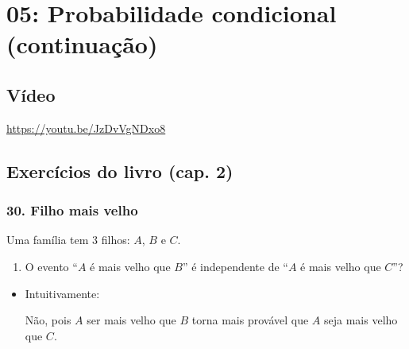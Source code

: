 \documentclass[
  11pt]{report}
\providecommand{\tightlist}{%
  \setlength{\itemsep}{0pt}\setlength{\parskip}{0pt}}
\begin{document}
\hypertarget{probabilidade-condicional-continuauxe7uxe3o}{%
\chapter*{05: Probabilidade condicional (continuação)}\label{probabilidade-condicional-continuauxe7uxe3o}}

\hypertarget{vuxeddeo-4}{%
\section*{Vídeo}\label{vuxeddeo-4}}

\begin{center} \url{https://youtu.be/JzDvVgNDxo8} \end{center}

\hypertarget{exercuxedcios-do-livro-cap.-2-1}{%
\section*{Exercícios do livro (cap. 2)}\label{exercuxedcios-do-livro-cap.-2-1}}

\hypertarget{filho-mais-velho}{%
\subsection*{30. Filho mais velho}\label{filho-mais-velho}}

\begin{rmdbox}

Uma família tem $3$ filhos: $A$, $B$ e $C$.

\begin{enumerate}
\def\labelenumi{\alph{enumi}.}
\tightlist
\item
  O evento ``$A$ é mais velho que $B$'' é independente de ``$A$ é mais velho que $C$''?
\end{enumerate}

\end{rmdbox}

\begin{itemize}
\item
  Intuitivamente:

  Não, pois $A$ ser mais velho que $B$ torna mais provável que $A$ seja mais velho que $C$.
\end{itemize}
\end{document}
